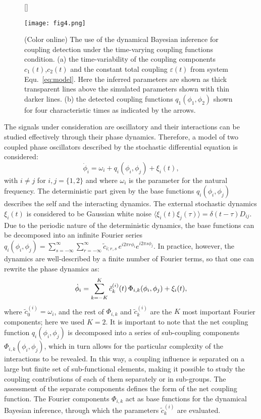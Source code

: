 \documentclass[pre,aps,twocolumn,showpacs]{revtex4}
\newcommand {\xxi} {\ensuremath{{\bf \xi}}}
\begin{document}
\begin{figure*}
[\FBwidth]
{\caption{(Color online) The use of the dynamical Bayesian inference for coupling detection under the time-varying coupling functions condition. (a) the time-variability of the coupling components $c_1(t)$,$c_2(t)$ and the constant total coupling $\varepsilon(t)$ from system Equ.\ \ref{eq:model}. Here the inferred parameters are shown as thick transparent lines above the simulated parameters shown with thin darker lines. (b) the detected coupling functions $q_1(\phi_1,\phi_2)$ shown for four characteristic times as indicated by the arrows. \label{fig4} }}
{\texttt{[image: fig4.png]}}
\end{figure*}

The signals under consideration are oscillatory and their interactions can be studied effectively through their phase dynamics. Therefore, a model of two coupled phase oscillators \cite{Kuramoto:84} described by the stochastic differential equation is considered:
\begin{equation}
\dot \phi_i= \omega_i  + q_i(\phi_i,\phi_j) + \xi_i(t),
\label{eq:phi}
\end{equation}
with $i\neq j$ for $i,j=\{1,2\}$ and where $\omega_i$ is the parameter for the natural frequency. The deterministic part given by the base functions $q_i(\phi_i,\phi_j)$ describes the self and the interacting dynamics. The external stochastic dynamics $\xi_i(t)$ is considered to be Gaussian white noise $\langle \xi_i(t) \xi_j(\tau)\rangle = \delta(t-\tau) D_{ij}$. Due to the periodic nature of the deterministic dynamics, the base functions can be decomposed into an infinite Fourier series $
q_i(\phi_i,\phi_j)  =    \sum_{s=-\infty}^\infty  \sum_{r=-\infty}^\infty \tilde c_{i;r,s}\, e^{i2\pi r \phi_i}  e^{i2\pi s \phi_j}$. In practice, however, the dynamics are well-described by a finite number of Fourier terms, so that one can rewrite the phase dynamics as:
$$\dot \phi_i=\sum_{k=-K}^{K} \tilde c^{(i)}_k (t) \, \Phi_{i,k}(\phi_i,\phi_j)  + \xxi_i(t),$$
where $\tilde c^{(i)}_0=\omega_i$, and the rest of $\Phi_{i,k}$ and  $\tilde c^{(i)}_k$ are the $K$ most important Fourier components; here we used $K=2$. It is important to note that the net coupling function $q_i(\phi_i,\phi_j)$ is decomposed into a series of sub-coupling components $\Phi_{i,k}(\phi_i,\phi_j)$, which in turn allows for the particular complexity of the interactions to be revealed. In this way, a coupling influence is separated on a large but finite set of sub-functional elements, making it possible to study the coupling contributions of each of them separately or in sub-groups. The assessment of the separate components defines the form of the net coupling function. The Fourier components $\Phi_{i,k}$ act as base functions for the dynamical Bayesian inference, through which the parameters $\tilde{c}_k^{(i)}$ are evaluated.
\end{document}
